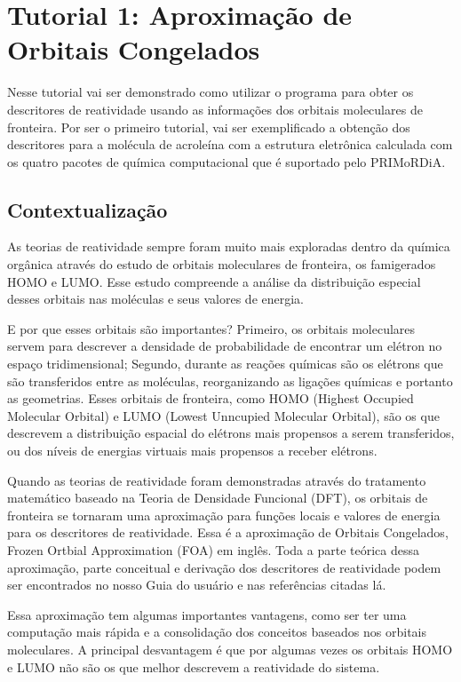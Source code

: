 \documentclass[a4paper,11pt]{refart}
\begin{document}
\newpage
\section{Tutorial 1: Aproximação de Orbitais Congelados}

Nesse tutorial vai ser  demonstrado como utilizar o programa para obter os descritores de reatividade usando as informações dos orbitais moleculares de fronteira. Por ser o primeiro tutorial, vai ser exemplificado a obtenção dos descritores para a molécula de acroleína  com a estrutura eletrônica calculada com os quatro pacotes de química computacional que é suportado pelo PRIMoRDiA.

\subsection{Contextualização}

As teorias de reatividade sempre foram muito mais exploradas dentro da química orgânica através do estudo de orbitais moleculares de fronteira, os famigerados HOMO e LUMO. Esse estudo compreende a análise da distribuição especial desses orbitais nas moléculas e seus valores de energia.

E por que esses orbitais são importantes? Primeiro, os orbitais moleculares servem para descrever a densidade de probabilidade de encontrar um elétron no espaço tridimensional; Segundo, durante as reações químicas são os elétrons que são transferidos entre as moléculas, reorganizando as ligações químicas e portanto as geometrias. Esses orbitais de fronteira, como HOMO (Highest Occupied Molecular Orbital) e LUMO (Lowest Unncupied Molecular Orbital), são os que descrevem a distribuição espacial do elétrons mais propensos a serem transferidos, ou dos níveis de energias virtuais mais propensos a receber elétrons.

Quando as teorias de reatividade foram demonstradas através do tratamento matemático baseado na Teoria de Densidade Funcional (DFT), os orbitais de fronteira se tornaram uma aproximação para funções locais e valores de energia para os descritores de reatividade. Essa é a aproximação de Orbitais Congelados, Frozen Ortbial Approximation (FOA) em inglês. Toda a parte teórica dessa aproximação, parte conceitual e derivação dos descritores de reatividade podem ser encontrados no nosso Guia do usuário e nas referências citadas lá. 

Essa aproximação tem algumas importantes vantagens, como ser ter uma computação mais rápida e a consolidação dos conceitos baseados nos orbitais moleculares. A principal desvantagem é que por algumas vezes os orbitais HOMO e LUMO não são os que melhor descrevem a reatividade do sistema.
\end{document}
